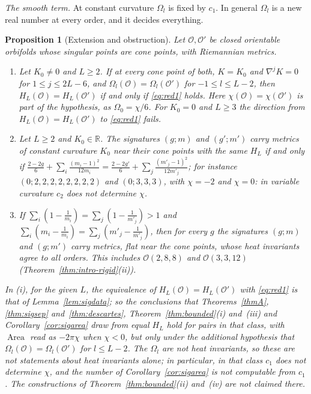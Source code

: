 \documentclass[pdflatex,sn-mathphys-num]{sn-jnl}
\theoremstyle{thmstyleone}%
\newtheorem{proposition}[theorem]{Proposition}%
\theoremstyle{thmstylethree}%
\newcommand{\Orb}{\mathcal{O}}
\newcommand{\Area}{\operatorname{Area}}
\begin{document}
\emph{The smooth term.} At constant curvature $\Omega_l$ is fixed by $c_1$. In general $\Omega_l$ is a new real number at every order, and it decides everything.

\begin{proposition}[Extension and obstruction]\label{prop:varcurv}
Let $\Orb,\Orb'$ be closed orientable orbifolds whose singular points are cone points, with Riemannian metrics.
\begin{enumerate}[label=(\roman*)]
\item Let $K_0\ne0$ and $L\ge2$. If at every cone point of both, $K=K_0$ and $\nabla^jK=0$ for $1\le j\le2L-6$, and $\Omega_l(\Orb)=\Omega_l(\Orb')$ for $-1\le l\le L-2$, then $H_L(\Orb)=H_L(\Orb')$ if and only if \eqref{eq:red1} holds. Here $\chi(\Orb)=\chi(\Orb')$ is part of the hypothesis, as $\Omega_0=\chi/6$. For $K_0=0$ and $L\ge3$ the direction from $H_L(\Orb)=H_L(\Orb')$ to \eqref{eq:red1} fails.
\item Let $L\ge2$ and $K_0\in\mathbb R$. The signatures $(g;m)$ and $(g';m')$ carry metrics of constant curvature $K_0$ near their cone points with the same $H_L$ if and only if
$\frac{2-2g}6+\sum_i\frac{(m_i-1)^2}{12m_i}=\frac{2-2g'}6+\sum_j\frac{(m'_j-1)^2}{12m'_j}$; for instance $(0;2,2,2,2,2,2,2,2)$ and $(0;3,3,3)$, with $\chi=-2$ and $\chi=0$: in variable curvature $c_2$ does not determine $\chi$.
\item If $\sum_i(1-\frac1{m_i})=\sum_j(1-\frac1{m'_j})>1$ and $\sum_i(m_i-\frac1{m_i})=\sum_j(m'_j-\frac1{m'_j})$, then for every $g$ the signatures $(g;m)$ and $(g;m')$ carry metrics, flat near the cone points, whose heat invariants agree to all orders. This includes $\Orb(2,8,8)$ and $\Orb(3,3,12)$ (Theorem~\ref{thm:intro-rigid}(ii)).
\end{enumerate}
In (i), for the given $L$, the equivalence of $H_L(\Orb)=H_L(\Orb')$ with \eqref{eq:red1} is that of Lemma~\ref{lem:sigdata}; so the conclusions that Theorems~\ref{thmA}, \ref{thm:sigsep} and~\ref{thm:descartes}, Theorem~\ref{thm:bounded}(i) and~(iii) and Corollary~\ref{cor:sigarea} draw from equal $H_L$ hold for pairs in that class, with $\Area$ read as $-2\pi\chi$ when $\chi<0$, but only under the additional hypothesis that $\Omega_l(\Orb)=\Omega_l(\Orb')$ for $l\le L-2$. The $\Omega_l$ are not heat invariants, so these are not statements about heat invariants alone; in particular, in that class $c_1$ does not determine $\chi$, and the number of Corollary~\ref{cor:sigarea} is not computable from $c_1$. The constructions of Theorem~\ref{thm:bounded}(ii) and~(iv) are not claimed there.
\end{proposition}
\end{document}
